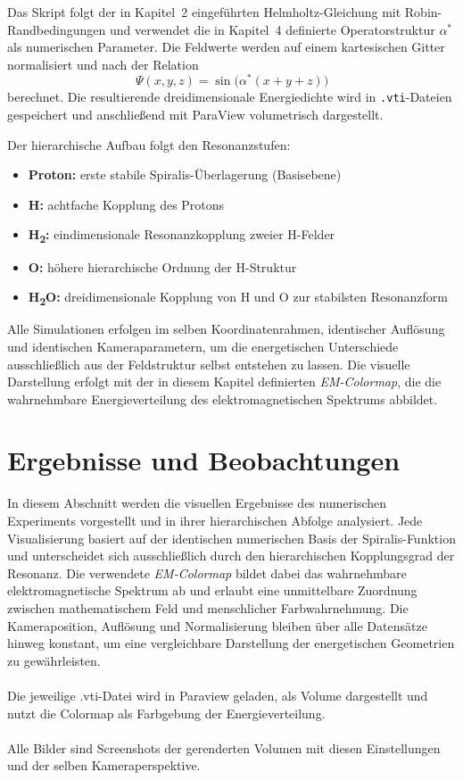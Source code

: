 Das Skript folgt der in Kapitel~2 eingeführten Helmholtz-Gleichung mit Robin-Randbedingungen und verwendet die in Kapitel~4 definierte Operatorstruktur \(\alpha^*\) als numerischen Parameter. Die Feldwerte werden auf einem kartesischen Gitter normalisiert und nach der Relation
\[
\Psi(x,y,z) = \sin\!\bigl(\alpha^*(x+y+z)\bigr)
\]
berechnet. Die resultierende dreidimensionale Energiedichte wird in \texttt{.vti}-Dateien gespeichert und anschließend mit ParaView volumetrisch dargestellt.

Der hierarchische Aufbau folgt den Resonanzstufen:
\begin{itemize}
  \item \textbf{Proton:} erste stabile Spiralis-Überlagerung (Basisebene)
  \item \textbf{H:} achtfache Kopplung des Protons
  \item \textbf{H\textsubscript{2}:} eindimensionale Resonanzkopplung zweier H-Felder
  \item \textbf{O:} höhere hierarchische Ordnung der H-Struktur
  \item \textbf{H\textsubscript{2}O:} dreidimensionale Kopplung von H und O zur stabilsten Resonanzform
\end{itemize}

Alle Simulationen erfolgen im selben Koordinatenrahmen, identischer Auflösung und identischen Kameraparametern, um die energetischen Unterschiede ausschließlich aus der Feldstruktur selbst entstehen zu lassen. Die visuelle Darstellung erfolgt mit der in diesem Kapitel definierten \textit{EM-Colormap}, die die wahrnehmbare Energieverteilung des elektromagnetischen Spektrums abbildet.

\newpage

\section{Ergebnisse und Beobachtungen}
In diesem Abschnitt werden die visuellen Ergebnisse des numerischen Experiments vorgestellt und in ihrer hierarchischen Abfolge analysiert.
Jede Visualisierung basiert auf der identischen numerischen Basis der Spiralis-Funktion und unterscheidet sich ausschließlich durch den hierarchischen Kopplungsgrad der Resonanz. 
Die verwendete \textit{EM-Colormap} bildet dabei das wahrnehmbare elektromagnetische Spektrum ab und erlaubt eine unmittelbare Zuordnung zwischen mathematischem Feld und menschlicher Farbwahrnehmung. 
Die Kameraposition, Auflösung und Normalisierung bleiben über alle Datensätze hinweg konstant, um eine vergleichbare Darstellung der energetischen Geometrien zu gewährleisten.
\\
\\
Die jeweilige .vti-Datei wird in Paraview geladen, als Volume dargestellt und nutzt die Colormap als Farbgebung der Energieverteilung.
\\
\\
Alle Bilder sind Screenshots der gerenderten Volumen mit diesen Einstellungen und der selben Kameraperspektive.

